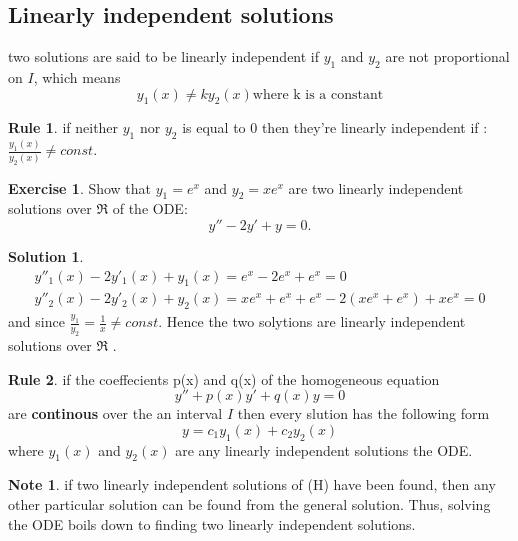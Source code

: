 \documentclass[11pt]{article}
\theoremstyle{definition}
\newtheorem{reg}{Rule}
\newtheorem{exer}{Exercise}
\newtheorem{sln}{Solution}
\newtheorem{note}{Note}
\begin{document}
\subsection{Linearly independent solutions}
two solutions are said to be linearly independent if $y_1$ and $y_2$ are not proportional on $I$, which means
\begin{equation}
    y_1(x) \neq ky_2(x) \text{where k is a constant}
\end{equation}
\begin{reg}
if neither $y_1$ nor $y_2$ is equal to 0 then they're linearly independent if : $\frac{y_1(x)}{y_2(x)} \neq  const.$
\end{reg}
\begin{exer}

Show that $y_1 = e^x$ and $y_2 = xe^x$ are two linearly independent solutions over $\Re$ of the ODE:
\begin{equation}
    y'' - 2y' + y = 0.
\end{equation}
\end{exer}
\begin{sln}
\begin{equation}
\begin{split}
    y''_1(x) -2y'_1(x) + y_1(x) = e^x -2e^x+e^x = 0\\
    y''_2(x) -2y'_2(x) + y_2(x) = xe^x+e^x+e^x - 2(xe^x+e^x) +xe^x = 0
    \end{split}
\end{equation}
and since $\frac{y_1}{y_2} = \frac{
1}{x} \neq const.$ Hence the two solytions are linearly independent solutions over $\Re$ .
\end{sln}
\begin{reg}
if the coeffecients p(x) and q(x) of the homogeneous equation 
\begin{equation}
    y''+p(x)y'+q(x)y=0
\end{equation}
are \textbf{continous} over the an interval $I$ then every slution has the following form 
\begin{equation}
    y = c_1 y_1(x)+c_2 y_2(x) 
\end{equation}
where $y_1(x)$ and $y_2(x)$ are any linearly independent solutions the ODE.
\end{reg}
\begin{note}
if two linearly independent solutions of (H)
have been found, then any other particular solution can be found from the general solution. Thus, solving the ODE boils down to finding two linearly independent solutions.
\end{note}
\end{document}
